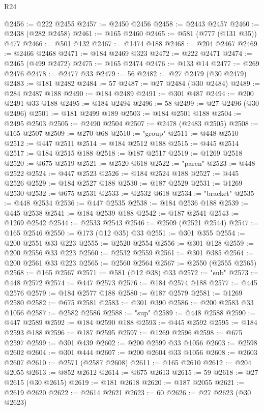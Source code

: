 \begin{lexlean}{R24}
\begin{coremodule}
@2456 := @222 @2455
@2457 := @2450 @2456
@2458 := @2443 @2457
@2460 := @2438 (@282 @2458)
@2461 := @165 @2460
@2465 := @581 (@777 (@131 @35)) @477
@2466 := @501 @132
@2467 := @1474 @188
@2468 := @204 @2467
@2469 := @2466 @2468
@2471 := @184 @2469 @323
@2472 := @222 @2471
@2474 := @2465 (@499 @2472)
@2475 := @165 @2474
@2476 := @133 @14
@2477 := @269 @2476
@2478 := @2477 @33
@2479 := 56
@2482 := @27 @2479 (@30 @2479)
@2483 := @181 @2482
@2484 := 57
@2487 := @27 @2484 (@30 @2484)
@2489 := @284 @2487 @188
@2490 := @184 @2489
@2491 := @301 @487
@2494 := @200 @2491 @33 @188
@2495 := @184 @2494
@2496 := 58
@2499 := @27 @2496 (@30 @2496)
@2501 := @181 @2499 @189
@2503 := @184 @2501 @188
@2504 := @2495 @2503
@2505 := @2490 @2504
@2507 := @2478 (@2483 @2505)
@2508 := @165 @2507
@2509 := @270 @68
@2510 := "group"
@2511 := @448 @2510
@2512 := @447 @2511
@2514 := @184 @2512 @188
@2515 := @445 @2514
@2517 := @184 @2515 @188
@2518 := @187 @2517
@2519 := @1269 @2518
@2520 := @675 @2519
@2521 := @2520 @618
@2522 := "paren"
@2523 := @448 @2522
@2524 := @447 @2523
@2526 := @184 @2524 @188
@2527 := @445 @2526
@2529 := @184 @2527 @188
@2530 := @187 @2529
@2531 := @1269 @2530
@2532 := @675 @2531
@2533 := @2532 @618
@2534 := "bracket"
@2535 := @448 @2534
@2536 := @447 @2535
@2538 := @184 @2536 @188
@2539 := @445 @2538
@2541 := @184 @2539 @188
@2542 := @187 @2541
@2543 := @1269 @2542
@2544 := @2533 @2543
@2546 := @2509 (@2521 @2544)
@2547 := @165 @2546
@2550 := @173 (@12 @35) @33
@2551 := @301 @355
@2554 := @200 @2551 @33 @223
@2555 := @2520 @2554
@2556 := @301 @128
@2559 := @200 @2556 @33 @223
@2560 := @2532 @2559
@2561 := @301 @385
@2564 := @200 @2561 @33 @223
@2565 := @2560 @2564
@2567 := @2550 (@2555 @2565)
@2568 := @165 @2567
@2571 := @581 (@12 @38) @33
@2572 := "sub"
@2573 := @448 @2572
@2574 := @447 @2573
@2576 := @184 @2574 @188
@2577 := @445 @2576
@2579 := @184 @2577 @188
@2580 := @187 @2579
@2581 := @1269 @2580
@2582 := @675 @2581
@2583 := @301 @390
@2586 := @200 @2583 @33 @1056
@2587 := @2582 @2586
@2588 := "sup"
@2589 := @448 @2588
@2590 := @447 @2589
@2592 := @184 @2590 @188
@2593 := @445 @2592
@2595 := @184 @2593 @188
@2596 := @187 @2595
@2597 := @1269 @2596
@2598 := @675 @2597
@2599 := @301 @439
@2602 := @200 @2599 @33 @1056
@2603 := @2598 @2602
@2604 := @301 @444
@2607 := @200 @2604 @33 @1056
@2608 := @2603 @2607
@2610 := @2571 (@2587 @2608)
@2611 := @165 @2610
@2612 := @204 @2055
@2613 := @852 @2612
@2614 := @675 @2613
@2615 := 59
@2618 := @27 @2615 (@30 @2615)
@2619 := @181 @2618
@2620 := @187 @2055
@2621 := @2619 @2620
@2622 := @2614 @2621
@2623 := 60
@2626 := @27 @2623 (@30 @2623)

\end{coremodule}
\end{lexlean}
